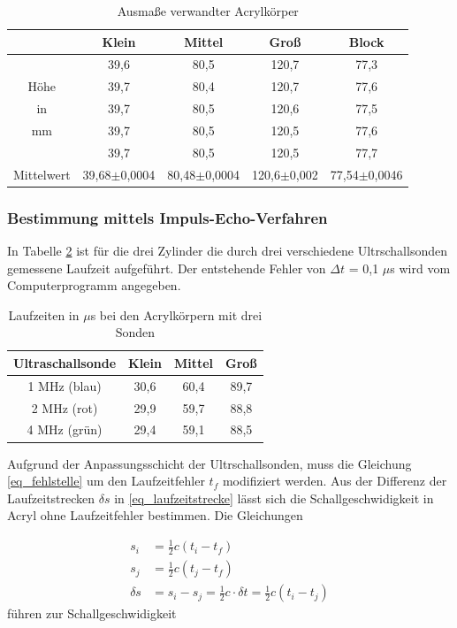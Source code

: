 \begin{table}[H]
 \begin{tabular}{c|c|c|c|c}
  & Klein & Mittel & Groß & Block\\
  \hline
	&39,6&	80,5&	120,7&	77,3\\
Höhe 	&39,7&	80,4&	120,7&	77,6\\
in 	&39,7&	80,5&	120,6&	77,5\\
mm 	&39,7&	80,5&	120,5&	77,6\\
	&39,7&	80,5&	120,5&	77,7\\
	\hline
Mittelwert	&39,68$\pm$0,0004&	80,48$\pm$0,0004 &	120,6$\pm$0,002&	77,54$\pm$0,0046
 \end{tabular}
 \caption{Ausmaße verwandter Acrylkörper}
\label{tab_masse}
\end{table}

\subsubsection{Bestimmung mittels Impuls-Echo-Verfahren}
In Tabelle \ref{tab_impulsecho} ist für die drei Zylinder die durch drei verschiedene Ultrschallsonden gemessene Laufzeit aufgeführt. Der
entstehende Fehler von $\Delta t$ = 0,1 $\mu$s wird vom Computerprogramm angegeben.

\begin{table}[H]
 \begin{tabular}{c|c|c|c}
 Ultraschallsonde & Klein & Mittel & Groß\\
 \hline
1 MHz (blau)&	30,6&	60,4&	89,7\\
2 MHz (rot)&	29,9&	59,7&	88,8\\
4 MHz (grün)&	29,4&	59,1&	88,5\\  
 \end{tabular}
\caption{Laufzeiten in $\mu$s bei den Acrylkörpern mit drei Sonden}
\label{tab_impulsecho}
\end{table}

Aufgrund der Anpassungsschicht der Ultrschallsonden, muss die Gleichung \eqref{eq_fehlstelle} um den Laufzeitfehler $t_f$ modifiziert werden.
Aus der Differenz der Laufzeitstrecken $\delta s$ in \eqref{eq_laufzeitstrecke} lässt sich die Schallgeschwidigkeit in Acryl ohne 
Laufzeitfehler bestimmen. Die Gleichungen

\begin{align}
\label{eq_laufzeitfehler}
 s_i &= \frac12 c (t_i - t_f)\\
 \nonumber
 s_j &= \frac12 c (t_j - t_f)\\
 \delta s &= s_i - s_j = \frac12 c \cdot  \delta t = \frac12 c (t_i - t_j)
 \label{eq_laufzeitstrecke}
\end{align}
führen zur Schallgeschwidigkeit


